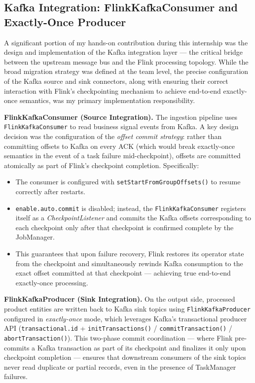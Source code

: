 \subsection{Kafka Integration: FlinkKafkaConsumer and Exactly-Once Producer}
\begin{justify}
    A significant portion of my hands-on contribution during this internship was the design and implementation of the Kafka integration layer — the critical bridge between the upstream message bus and the Flink processing topology. While the broad migration strategy was defined at the team level, the precise configuration of the Kafka source and sink connectors, along with ensuring their correct interaction with Flink's checkpointing mechanism to achieve end-to-end exactly-once semantics, was my primary implementation responsibility.

    \textbf{FlinkKafkaConsumer (Source Integration).} The ingestion pipeline uses \texttt{FlinkKafkaConsumer} to read business signal events from Kafka. A key design decision was the configuration of the \textit{offset commit strategy}: rather than committing offsets to Kafka on every ACK (which would break exactly-once semantics in the event of a task failure mid-checkpoint), offsets are committed atomically as part of Flink's checkpoint completion. Specifically:
    \begin{itemize}
        \item The consumer is configured with \texttt{setStartFromGroupOffsets()} to resume correctly after restarts.
        \item \texttt{enable.auto.commit} is disabled; instead, the \texttt{FlinkKafkaConsumer} registers itself as a \textit{CheckpointListener} and commits the Kafka offsets corresponding to each checkpoint only after that checkpoint is confirmed complete by the JobManager.
        \item This guarantees that upon failure recovery, Flink restores its operator state from the checkpoint and simultaneously rewinds Kafka consumption to the exact offset committed at that checkpoint — achieving true end-to-end exactly-once processing.
    \end{itemize}

    \textbf{FlinkKafkaProducer (Sink Integration).} On the output side, processed product entities are written back to Kafka sink topics using \texttt{FlinkKafkaProducer} configured in \textit{exactly-once} mode, which leverages Kafka's transactional producer API (\texttt{transactional.id} + \texttt{initTransactions()} / \texttt{commitTransaction()} / \texttt{abortTransaction()}). This two-phase commit coordination — where Flink pre-commits a Kafka transaction as part of its checkpoint and finalizes it only upon checkpoint completion — ensures that downstream consumers of the sink topics never read duplicate or partial records, even in the presence of TaskManager failures.


\end{justify}
